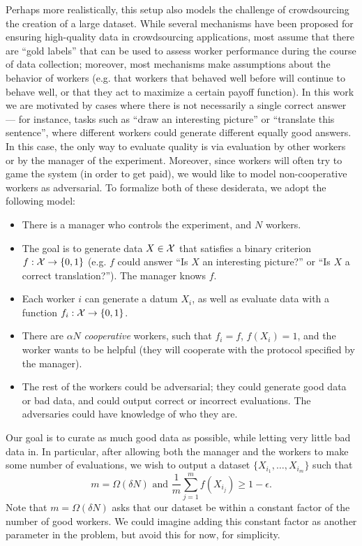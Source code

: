 \documentclass[anon,12pt]{colt2016} %
\newcommand{\goodfrac}{\alpha}
\newcommand{\quality}{\epsilon}
\begin{document}
Perhaps more realistically, this setup also models the challenge of crowdsourcing the creation of a large dataset.  While several mechanisms have been proposed for ensuring high-quality 
data in crowdsourcing applications, most assume that there are ``gold labels'' 
that can be used to assess worker performance during the course of 
data collection; moreover, most mechanisms make assumptions about the behavior 
of workers (e.g. that workers that behaved well before will continue to 
behave well, or that they act to maximize a certain payoff function).
In this work we are motivated by cases where there is not necessarily a single 
correct answer --- for instance, tasks such as ``draw an interesting picture'' 
or ``translate this sentence'', where different workers could generate different 
equally good answers. In this case, the only way to evaluate quality is 
via evaluation by other workers or by the manager of the experiment. 
Moreover, since workers will often try to game the system (in order to 
get paid), we would like to model non-cooperative workers as adversarial. 
To formalize both of these desiderata, we adopt the following model:
\begin{itemize}
\item There is a manager who controls the experiment, and 
      $N$ workers.
\item The goal is to generate data $X \in \mathcal{X}$ that satisfies 
      a binary criterion $f : \mathcal{X} \to \{0,1\}$ (e.g. $f$ could answer
      ``Is $X$ an interesting picture?'' or ``Is $X$ a correct translation?'').
      The manager knows $f$.
\item Each worker $i$ can generate a datum $X_i$, as well as evaluate 
      data with a function $f_i : \mathcal{X} \to \{0,1\}$.
\item There are $\goodfrac N$ \emph{cooperative} workers, such that 
      $f_i = f$, $f(X_i) = 1$, and the worker 
      wants to be helpful (they will cooperate with the protocol 
      specified by the manager).
\item The rest of the workers could be adversarial; they could generate 
      good data or bad data, and could output correct or incorrect evaluations. 
      The adversaries could have knowledge of who they are.
\end{itemize}
Our goal is to curate as much good data as possible, while letting very little 
bad data in. In particular, after allowing both the manager and the workers to 
make some number of evaluations, we wish to output a dataset 
$\{X_{i_1}, \ldots, X_{i_m}\}$ such that 
\begin{equation}
\label{eq:target}
m = \Omega(\delta N)\text{ and }\frac{1}{m} \sum_{j=1}^m f(X_{i_j}) \geq 1-\quality.
\end{equation}
Note that $m = \Omega(\delta N)$ asks that our dataset be within a constant 
factor of the number of good workers. We could imagine adding this constant 
factor as another parameter in the problem, but avoid this for now, for simplicity.
\end{document}
